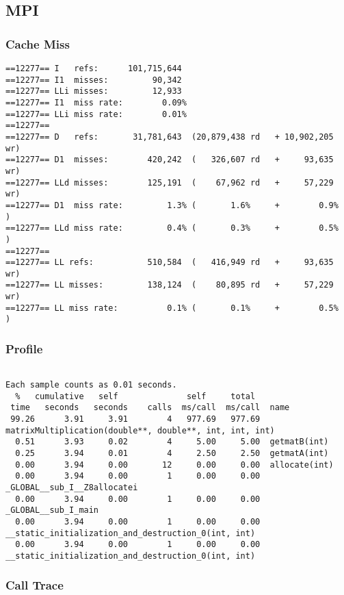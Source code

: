 \documentclass[7pt]{article}
\begin{document}
\subsection{MPI}
\subsubsection{Cache Miss}

\begin{verbatim}
==12277== I   refs:      101,715,644
==12277== I1  misses:         90,342
==12277== LLi misses:         12,933
==12277== I1  miss rate:        0.09%
==12277== LLi miss rate:        0.01%
==12277==
==12277== D   refs:       31,781,643  (20,879,438 rd   + 10,902,205 wr)
==12277== D1  misses:        420,242  (   326,607 rd   +     93,635 wr)
==12277== LLd misses:        125,191  (    67,962 rd   +     57,229 wr)
==12277== D1  miss rate:         1.3% (       1.6%     +        0.9%  )
==12277== LLd miss rate:         0.4% (       0.3%     +        0.5%  )
==12277==
==12277== LL refs:           510,584  (   416,949 rd   +     93,635 wr)
==12277== LL misses:         138,124  (    80,895 rd   +     57,229 wr)
==12277== LL miss rate:          0.1% (       0.1%     +        0.5%  )
\end{verbatim}


\subsubsection{Profile}
\begin{verbatim}

Each sample counts as 0.01 seconds.
  %   cumulative   self              self     total
 time   seconds   seconds    calls  ms/call  ms/call  name
 99.26      3.91     3.91        4   977.69   977.69  matrixMultiplication(double**, double**, int, int, int)
  0.51      3.93     0.02        4     5.00     5.00  getmatB(int)
  0.25      3.94     0.01        4     2.50     2.50  getmatA(int)
  0.00      3.94     0.00       12     0.00     0.00  allocate(int)
  0.00      3.94     0.00        1     0.00     0.00  _GLOBAL__sub_I__Z8allocatei
  0.00      3.94     0.00        1     0.00     0.00  _GLOBAL__sub_I_main
  0.00      3.94     0.00        1     0.00     0.00  __static_initialization_and_destruction_0(int, int)
  0.00      3.94     0.00        1     0.00     0.00  __static_initialization_and_destruction_0(int, int)

\end{verbatim}
\subsubsection{Call Trace}
\end{document}
